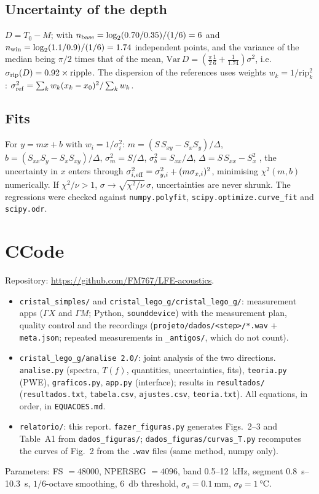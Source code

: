 \documentclass[9pt,a4paper,twocolumn]{extarticle}
\newcommand{\umm}{\milli\metre}
\newcommand{\ukHz}{\kilo\hertz}
\newcommand{\udB}{\decibel}
\newcommand{\us}{\second}
\newcommand{\GX}{\ensuremath{\Gamma X}}
\newcommand{\GM}{\ensuremath{\Gamma M}}
\begin{document}
\subsection*{Uncertainty of the depth}
$D=T_0-M$; with $n_{\rm base}=\log_2(0.70/0.35)/(1/6)=6$ and $n_{\rm win}=\log_2(1.1/0.9)/(1/6)=1.74$ independent points, and the variance of the median being $\pi/2$ times that of the mean, $\mathrm{Var}\,D=\left(\frac\pi2\frac16+\frac1{1.74}\right)\sigma^2$, i.e.\ $\sigma_{\rm rip}(D)=0.92\times\mathrm{ripple}$. The dispersion of the references uses weights $w_k=1/\mathrm{rip}_k^2$: $\sigma_{\rm ref}^2=\sum_kw_k(x_k-x_0)^2/\sum_kw_k$.

\subsection*{Fits}
For $y=mx+b$ with $w_i=1/\sigma_i^2$: $m=(S\,S_{xy}-S_xS_y)/\Delta$, $b=(S_{xx}S_y-S_xS_{xy})/\Delta$, $\sigma_m^2=S/\Delta$, $\sigma_b^2=S_{xx}/\Delta$, $\Delta=S\,S_{xx}-S_x^2$ \cite{bev}, the uncertainty in $x$ enters through $\sigma_{i,\rm eff}^2=\sigma_{y,i}^2+(m\sigma_{x,i})^2$, minimising $\chi^2(m,b)$ numerically. If $\chi^2/\nu>1$, $\sigma\to\sqrt{\chi^2/\nu}\,\sigma$, uncertainties are never shrunk. The regressions were checked against \texttt{numpy.polyfit}, \texttt{scipy.optimize.curve\_fit} and \texttt{scipy.odr}.

\section*{C\quad Code}
Repository: \url{https://github.com/FM767/LFE-acoustics}.
\begin{itemize}\setlength{\itemsep}{0pt}
\item \texttt{cristal\_simples/} and \texttt{cristal\_lego\_g/cristal\_lego\_g/}: measurement apps (\GX{} and \GM; Python, \texttt{sounddevice}) with the measurement plan, quality control and the recordings (\texttt{projeto/dados/<step>/*.wav} + \texttt{meta.json}; repeated measurements in \texttt{\_antigos/}, which do not count).
\item \texttt{cristal\_lego\_g/analise 2.0/}: joint analysis of the two directions. \texttt{analise.py} (spectra, $T(f)$, quantities, uncertainties, fits), \texttt{teoria.py} (PWE), \texttt{graficos.py}, \texttt{app.py} (interface); results in \texttt{resultados/} (\texttt{resultados.txt}, \texttt{tabela.csv}, \texttt{ajustes.csv}, \texttt{teoria.txt}). All equations, in order, in \texttt{EQUACOES.md}.
\item \texttt{relatorio/}: this report. \texttt{fazer\_figuras.py} generates Figs.~2--3 and Table~A1 from \texttt{dados\_figuras/}; \texttt{dados\_figuras/curvas\_T.py} recomputes the curves of Fig.~2 from the \texttt{.wav} files (same method, numpy only).
\end{itemize}
Parameters: FS $=48000$, NPERSEG $=4096$, band 0.5--\SI{12}{\ukHz}, segment \SIrange{0.8}{10.3}{\us}, $1/6$-octave smoothing, \SI{6}{\udB} threshold, $\sigma_a=\SI{0.1}{\umm}$, $\sigma_\theta=\SI{1}{\celsius}$.
\end{document}
